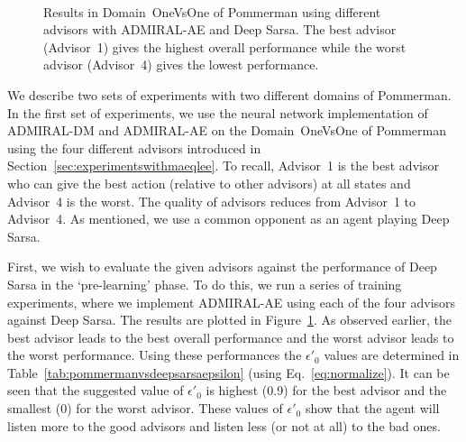 \documentclass[jair, twoside,11pt,theapa]{article}
\begin{document}
\begin{figure}[h]
    \centering
	\\
  \caption{Results in Domain~OneVsOne of Pommerman using different advisors with ADMIRAL-AE and Deep Sarsa.  The best advisor (Advisor~1) gives the highest overall performance while the worst advisor (Advisor~4) gives the lowest performance. 
  }
 

	\label{fig:onevsoneoffpolicy}
\end{figure}

We describe two sets of experiments with two different domains of Pommerman. In the first set of experiments, we  use the neural network implementation of ADMIRAL-DM and ADMIRAL-AE on the Domain~OneVsOne of Pommerman using the four different advisors introduced in Section~\ref{sec:experimentswithmaeqlee}. To recall, Advisor~1 is the best advisor who can give the best action (relative to other advisors) at all states and Advisor~4 is the worst. The quality of advisors reduces from Advisor~1 to Advisor~4. As mentioned, we use a common opponent as an agent playing Deep Sarsa.



First, we wish to evaluate the given advisors against the performance of Deep Sarsa in the `pre-learning' phase. To do this, we run a series of training experiments, where we implement ADMIRAL-AE using each of the four advisors against Deep Sarsa. The results are plotted in Figure~\ref{fig:onevsoneoffpolicy}. As observed earlier, the best advisor leads to the best overall performance and the worst advisor leads to the worst performance. Using these performances the $\epsilon'_0$ values are determined in Table~\ref{tab:pommermanvsdeepsarsaepsilon} (using Eq.~\ref{eq:normalize}). It can be seen that the suggested value of $\epsilon'_0$ is highest (0.9) for the best advisor and the smallest (0) for the worst advisor. These values of $\epsilon'_0$ show that the agent will listen more to the good advisors and listen less (or not at all) to the bad ones.
\end{document}
